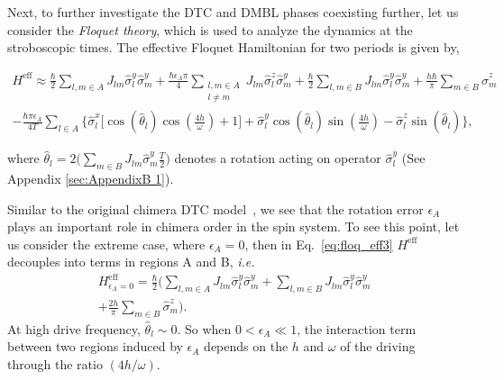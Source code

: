 \documentclass[%
nofootinbib,
reprint,
superscriptaddress,
amsmath,amssymb,showkeys,
aps,
prb,
]{revtex4-2}
\begin{document}
	Next, to further investigate the DTC and DMBL phases coexisting further, let us consider the \textit{Floquet theory}, which is used to analyze the dynamics at the stroboscopic times. The effective Floquet Hamiltonian for two periods is given by,
	\begin{widetext}
		\begin{multline}
			H^{\mathrm{eff}} \approx\frac{\hbar}{2} \sum_{l,m\in A}J_{lm}\hat{\sigma}_l^y\hat{\sigma}_m^y +\frac{\hbar \epsilon_A \pi}{4} \sum_{\substack{l,m\in A\\l\neq m}} J_{lm}\hat{\sigma}^z_l\hat{\sigma}^y_m + \frac{\hbar}{2}\sum_{l,m\in B}J_{lm}\hat{\sigma}_l^y \hat{\sigma}_m^y + \frac{h\hbar}{\pi}\sum_{m \in B}\hat{\sigma}^z_m \\ -\frac{\hbar \pi \epsilon_A}{4T}\sum_{l\in A}\Bigg\{\hat{\sigma}^x_l \bigg[\cos(\hat{\theta}_l)\cos(\frac{4h}{\omega})+1 \bigg] + \hat{\sigma}^y_l \cos(\hat{\theta}_l)\sin(\frac{4h}{\omega})-\hat{\sigma}^z_l \sin(\hat{\theta}_l)\Bigg\},
		\label{eq:floq_eff3}
		\end{multline}
	\end{widetext}

	where $\displaystyle \hat{\theta}_l = 2 \Big(\sum_{m \in B}J_{lm}\hat{\sigma}^y_m \frac{T}{2} \Big)$ denotes a rotation acting on operator $\hat{\sigma}^y_l$ (See Appendix \ref{sec:AppendixB	1}).
	
	Similar to the original chimera DTC model~\cite{sakurai_phys_nodate}, we see that the rotation error $\epsilon_A$ plays an important role in chimera order in the spin system. To see this point, let us consider the extreme case, where $\epsilon_A=0$, then in Eq.~\eqref{eq:floq_eff3}  $H^\mathrm{eff}$ decouples into terms in regions A and B, \textit{i.e.}
	\begin{multline}
		H^{\mathrm{eff}}_{\epsilon_A=0} =  \frac{\hbar}{2}\Bigg( \sum_{l,m\in A} J_{lm} \hat{\sigma}^y_l\hat{\sigma}^y_m +\sum_{l,m\in B} J_{lm} \hat{\sigma}^y_l\hat{\sigma}^y_m\\+\frac{2h }{\pi}\sum_{m \in B}\hat{\sigma}^z_m\Bigg).
	\end{multline}
	At high drive  frequency, $\hat{\theta}_l \sim 0$. So when $0<\epsilon_A \ll 1$, the interaction term between two regions induced by $\epsilon_A$ depends on the $h$ and $\omega$ of the driving through the ratio $(4h/\omega)$. 
	
\end{document}
